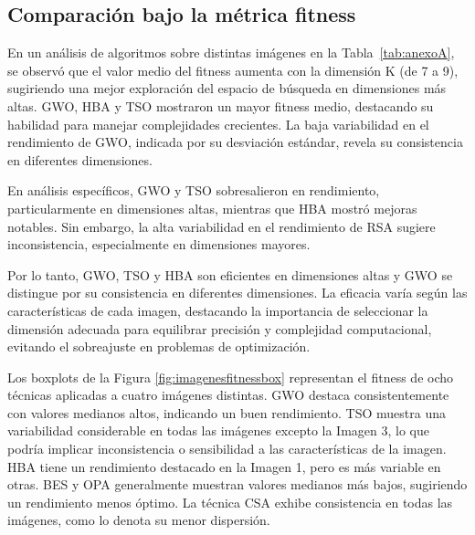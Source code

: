 \documentclass[conference]{IEEEtran}
\begin{document}
\subsection{Comparación bajo la métrica fitness}
\noindent En un análisis de algoritmos sobre distintas imágenes en la Tabla~\ref{tab:anexoA}, se observó que el valor medio del fitness aumenta con la dimensión K (de 7 a 9), sugiriendo una mejor exploración del espacio de búsqueda en dimensiones más altas. GWO, HBA y TSO mostraron un mayor fitness medio, destacando su habilidad para manejar complejidades crecientes. La baja variabilidad en el rendimiento de GWO, indicada por su desviación estándar, revela su consistencia en diferentes dimensiones.

\noindent En análisis específicos, GWO y TSO sobresalieron en rendimiento, particularmente en dimensiones altas, mientras que HBA mostró mejoras notables. Sin embargo, la alta variabilidad en el rendimiento de RSA sugiere inconsistencia, especialmente en dimensiones mayores.

\noindent Por lo tanto, GWO, TSO y HBA son eficientes en dimensiones altas y GWO se distingue por su consistencia en diferentes dimensiones. La eficacia varía según las características de cada imagen, destacando la importancia de seleccionar la dimensión adecuada para equilibrar precisión y complejidad computacional, evitando el sobreajuste en problemas de optimización.


\noindent Los boxplots  de la Figura \ref{fig:imagenesfitnessbox} representan el fitness de ocho técnicas aplicadas a cuatro imágenes distintas. GWO destaca consistentemente con valores medianos altos, indicando un buen rendimiento. TSO muestra una variabilidad considerable en todas las imágenes excepto la Imagen 3, lo que podría implicar inconsistencia o sensibilidad a las características de la imagen. HBA tiene un rendimiento destacado en la Imagen 1, pero es más variable en otras. BES y OPA generalmente muestran valores medianos más bajos, sugiriendo un rendimiento menos óptimo. La técnica CSA exhibe consistencia en todas las imágenes, como lo denota su menor dispersión.
\end{document}
